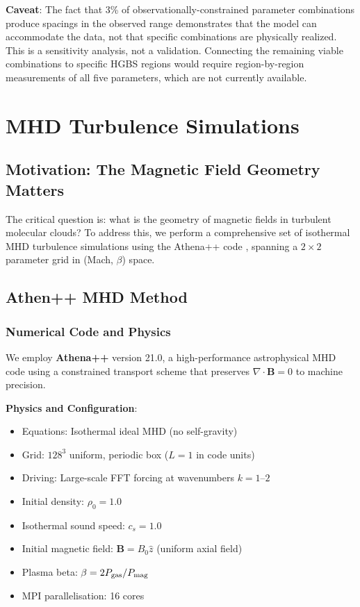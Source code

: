 \documentclass[11pt,a4paper]{article}
\begin{document}
\textbf{Caveat}: The fact that 3\% of observationally-constrained parameter combinations produce spacings in the observed range demonstrates that the model can accommodate the data, not that specific combinations are physically realized. This is a sensitivity analysis, not a validation. Connecting the remaining viable combinations to specific HGBS regions would require region-by-region measurements of all five parameters, which are not currently available.

\section{MHD Turbulence Simulations}
\label{sec:mhd}

\subsection{Motivation: The Magnetic Field Geometry Matters}

The critical question is: what is the geometry of magnetic fields in turbulent molecular clouds? To address this, we perform a comprehensive set of isothermal MHD turbulence simulations using the Athena++ code \citep{Stone2020}, spanning a $2\times2$ parameter grid in (Mach, $\beta$) space.

\subsection{Athen++ MHD Method}

\subsubsection{Numerical Code and Physics}

We employ \textbf{Athena++} version 21.0, a high-performance astrophysical MHD code using a constrained transport scheme that preserves $\nabla \cdot \mathbf{B} = 0$ to machine precision.

\textbf{Physics and Configuration}:
\begin{itemize}
    \item Equations: Isothermal ideal MHD (no self-gravity)
    \item Grid: $128^3$ uniform, periodic box ($L = 1$ in code units)
    \item Driving: Large-scale FFT forcing at wavenumbers $k = 1$--$2$
    \item Initial density: $\rho_0 = 1.0$
    \item Isothermal sound speed: $c_s = 1.0$
    \item Initial magnetic field: $\mathbf{B} = B_0 \hat{z}$ (uniform axial field)
    \item Plasma beta: $\beta = 2P_{\rm gas}/P_{\rm mag}$
    \item MPI parallelisation: 16 cores
\end{itemize}
\end{document}
